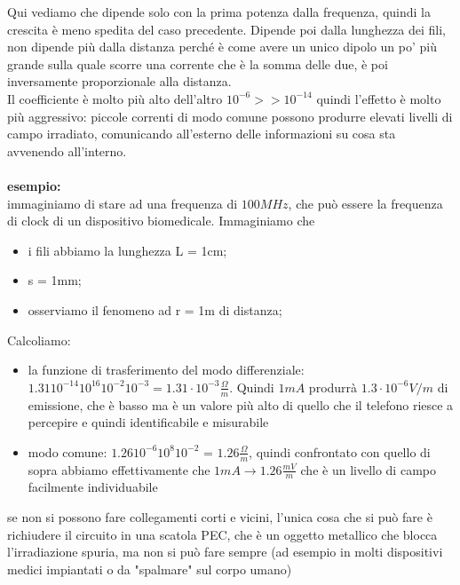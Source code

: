 \documentclass[oneside, 12pt]{extbook}
\begin{document}
Qui vediamo che dipende solo con la prima potenza dalla frequenza, quindi la crescita è meno spedita del caso precedente. Dipende poi dalla lunghezza dei fili, non dipende più dalla distanza perché è come avere un unico dipolo un po' più grande sulla quale scorre una corrente che è la somma delle due, è poi inversamente proporzionale alla distanza.\\Il coefficiente è molto più alto dell'altro $10^{-6} >> 10^{-14}$ quindi l'effetto è molto più aggressivo: piccole correnti di modo comune possono produrre elevati livelli di campo irradiato, comunicando all'esterno delle informazioni su cosa sta avvenendo all'interno.\\\\ \textbf{esempio:}\\immaginiamo di stare ad una frequenza di $100 MHz$, che può essere la frequenza di clock di un dispositivo biomedicale. Immaginiamo che 
\begin{itemize}
	\item i fili abbiamo la lunghezza L = 1cm;
	\item s = 1mm;
	\item osserviamo il fenomeno ad r = 1m di distanza;
\end{itemize}
Calcoliamo:
\begin{itemize}
	\item la funzione di trasferimento del modo differenziale: $1.31 10^{-14} 10^{16}10^{-2}10^{-3} = 1.31 \cdot 10^{-3} \frac{\Omega}{m}$. Quindi $1mA$ produrrà $1.3 \cdot 10^{-6} V/m$ di emissione, che è basso ma è un valore più alto di quello che il telefono riesce a percepire e quindi identificabile e misurabile
	\item modo comune: $1.26 10^{-6} 10^{8} 10^{-2}$ = $1.26 \frac{\Omega}{m}$, quindi confrontato con quello di sopra abbiamo effettivamente che $1mA \rightarrow 1.26 \frac{mV}{m}$ che è un livello di campo facilmente individuabile
\end{itemize}
se non si possono fare collegamenti corti e vicini, l'unica cosa che si può fare è richiudere il circuito in una scatola PEC, che è un oggetto metallico che blocca l'irradiazione spuria, ma non si può fare sempre (ad esempio in molti dispositivi medici impiantati o da "spalmare" sul corpo umano)
\end{document}
